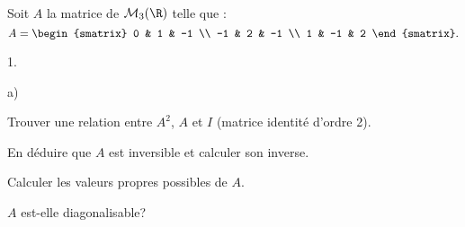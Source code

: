 \documentclass[11pt]{article}%
\begin{document}
\begin{exerciceSP}~\\
  Soit $A$ la matrice de $\mathcal{M}_3 (\R)$ telle que :
  \[
  A = 
  \begin{smatrix} 
    0 & 1 & -1 \\ 
    -1 & 2 & -1 \\ 
    1 & -1 & 2 
  \end{smatrix}. 
  \] 
  \begin{noliste}{1.}
    \setlength{\itemsep}{2mm}
  \item \begin{noliste}{a)}
    \setlength{\itemsep}{2mm}
    \item Trouver une relation entre $A^2$, $A$ et $I$ (matrice
      identité d'ordre 2).
    \item En déduire que $A$ est inversible et calculer son inverse.
    \end{noliste}
  \item Calculer les valeurs propres possibles de $A$.
  \item $A$ est-elle diagonalisable?
  \end{noliste}
\end{exerciceSP}

\end{document}
